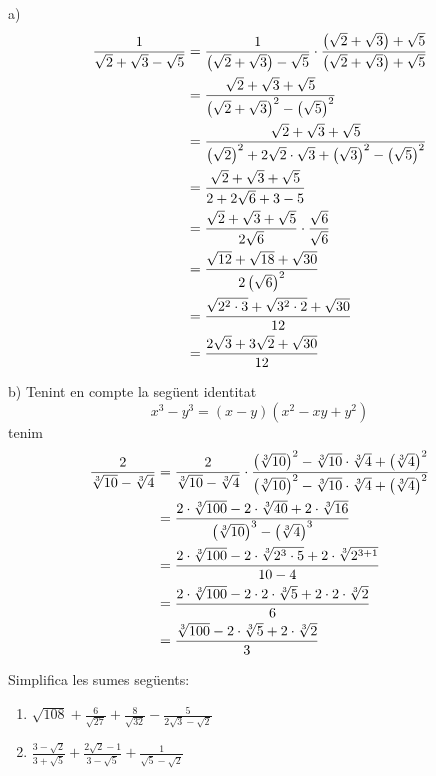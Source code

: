 \begin{solucio}
a)%
\begin{align*}
\frac{1}{\sqrt{2}+\sqrt{3}-\sqrt{5}} &=\frac{1}{\left( \sqrt{2}+\sqrt{3}%
\right) -\sqrt{5}}\cdot \frac{\left( \sqrt{2}+\sqrt{3}\right) +\sqrt{5}}{%
\left( \sqrt{2}+\sqrt{3}\right) +\sqrt{5}} \\
&=\frac{\sqrt{2}+\sqrt{3}+\sqrt{5}}{\left( \sqrt{2}+\sqrt{3}\right)
^{2}-\left( \sqrt{5}\right) ^{2}} \\
&=\frac{\sqrt{2}+\sqrt{3}+\sqrt{5}}{\left( \sqrt{2}\right) ^{2}+2\sqrt{2}%
\cdot \sqrt{3}+\left( \sqrt{3}\right) ^{2}-\left( \sqrt{5}\right) ^{2}} \\
&=\frac{\sqrt{2}+\sqrt{3}+\sqrt{5}}{2+2\sqrt{6}+3-5} \\
&=\frac{\sqrt{2}+\sqrt{3}+\sqrt{5}}{2\sqrt{6}}\cdot \frac{\sqrt{6}}{\sqrt{6}%
} \\
&=\frac{\sqrt{12}+\sqrt{18}+\sqrt{30}}{2\left( \sqrt{6}\right) ^{2}} \\
&=\frac{\sqrt{2^{2}\cdot 3}+\sqrt{3^{2}\cdot 2}+\sqrt{30}}{12} \\
&=\frac{2\sqrt{3}+3\sqrt{2}+\sqrt{30}}{12}
\end{align*}

b) Tenint en compte la següent identitat%
\begin{equation*}
x^{3}-y^{3}=(x-y)(x^{2}-xy+y^{2})
\end{equation*}%
tenim%
\begin{align*}
\frac{2}{\sqrt[3]{10}-\sqrt[3]{4}} &=\frac{2}{\sqrt[3]{10}-\sqrt[3]{4}}%
\cdot \frac{\left( \sqrt[3]{10}\right) ^{2}-\sqrt[3]{10}\cdot \sqrt[3]{4}%
+\left( \sqrt[3]{4}\right) ^{2}}{\left( \sqrt[3]{10}\right) ^{2}-\sqrt[3]{10}%
\cdot \sqrt[3]{4}+\left( \sqrt[3]{4}\right) ^{2}} \\
&=\frac{2\cdot \sqrt[3]{100}-2\cdot \sqrt[3]{40}+2\cdot \sqrt[3]{16}}{%
\left( \sqrt[3]{10}\right) ^{3}-\left( \sqrt[3]{4}\right) ^{3}} \\
&=\frac{2\cdot \sqrt[3]{100}-2\cdot \sqrt[3]{2^{3}\cdot 5}+2\cdot \sqrt[3]{%
2^{3+1}}}{10-4} \\
&=\frac{2\cdot \sqrt[3]{100}-2\cdot 2\cdot \sqrt[3]{5}+2\cdot 2\cdot \sqrt[3%
]{2}}{6} \\
&=\frac{\sqrt[3]{100}-2\cdot \sqrt[3]{5}+2\cdot \sqrt[3]{2}}{3}
\end{align*}
\end{solucio}

\begin{exercici}
Simplifica les sumes següents:

\begin{enumerate}
\item[a)] $\sqrt{108}+\frac{6}{\sqrt{27}}+\frac{8}{\sqrt{32}}-\frac{5}{2%
\sqrt{3}-\sqrt{2}}$

\item[b)] $\frac{3-\sqrt{2}}{3+\sqrt{5}}+\frac{2\sqrt{2}-1}{3-\sqrt{5}}+%
\frac{1}{\sqrt{5}-\sqrt{2}}$
\end{enumerate}

\end{exercici}

